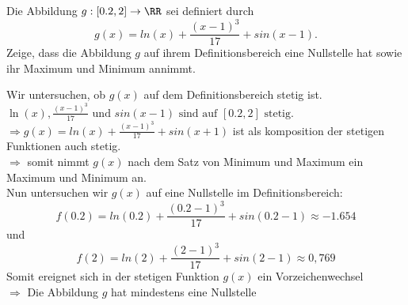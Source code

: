 Die Abbildung $g:[0.2,2]\to\RR$ sei definiert durch
\[g(x)=ln(x)+\frac{(x-1)^3}{17}+sin(x-1).\]
Zeige, dass die Abbildung $g$ auf ihrem Definitionsbereich eine Nullstelle hat sowie ihr Maximum und Minimum annimmt.

\begin{solution}
    Wir untersuchen, ob $g(x)$ auf dem Definitionsbereich stetig ist. \\
    \(\ln(x), \frac{(x-1)^3}{17} \text{ und } sin(x-1) \text{ sind auf } [0.2,2] \text{ stetig.}\) \\
    $\Rightarrow g(x)=ln(x)+\frac{(x-1)^3}{17}+sin(x+1) $ ist als komposition der stetigen Funktionen auch stetig. \\
    $\Rightarrow $ somit nimmt $g(x)$ nach dem Satz von Minimum und Maximum ein Maximum und Minimum an. \\[2em]
    Nun untersuchen wir $g(x)$ auf eine Nullstelle im Definitionsbereich: \\
    \[f(0.2)=ln(0.2)+\frac{(0.2-1)^3}{17}+sin(0.2-1)\approx -1.654\]
    und 
    \[f(2)=ln(2)+\frac{(2-1)^3}{17}+sin(2-1)\approx 0,769\]
    Somit ereignet sich in der stetigen Funktion $g(x)$ ein Vorzeichenwechsel\\
    $\Rightarrow$ Die Abbildung $g$ hat mindestens eine Nullstelle
\end{solution}